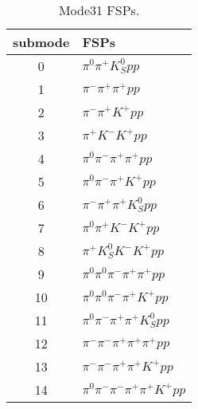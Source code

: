 \begin{table}[h!]
\begin{center}
\begin{tabular}{cl}
\hline
submode& FSPs\\
\hline
0 & $\pi^0 \pi^+ K_S^0 {p} p $ \\
1 & $\pi^- \pi^+ \pi^+ {p} p $ \\
2 & $\pi^- \pi^+ K^+ {p} p $ \\
3 & $\pi^+ K^- K^+ {p} p $ \\
4 & $\pi^0 \pi^- \pi^+ \pi^+ {p} p $ \\
5 & $\pi^0 \pi^- \pi^+ K^+ {p} p $ \\
6 & $\pi^- \pi^+ \pi^+ K_S^0 {p} p $ \\
7 & $\pi^0 \pi^+ K^- K^+ {p} p $ \\
8 & $\pi^+ K_S^0 K^- K^+ {p} p $ \\
9 & $\pi^0 \pi^0 \pi^- \pi^+ \pi^+ {p} p $ \\
10 & $\pi^0 \pi^0 \pi^- \pi^+ K^+ {p} p $ \\
11 & $\pi^0 \pi^- \pi^+ \pi^+ K_S^0 {p} p $ \\
12 & $\pi^- \pi^- \pi^+ \pi^+ \pi^+ {p} p $ \\
13 & $\pi^- \pi^- \pi^+ \pi^+ K^+ {p} p $ \\
14 & $\pi^0 \pi^- \pi^- \pi^+ \pi^+ K^+ {p} p $ \\
\hline
\end{tabular}
\label{tab:Mode31FSPs}
\caption{Mode31 FSPs.}
\end{center}
\end{table}
